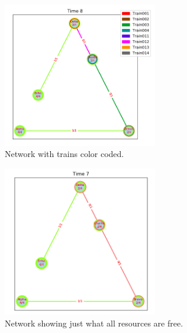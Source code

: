 \begin{figure}[h]
    \centering
    \includegraphics[width=0.6\textwidth]{graph}
    \caption{ Network with trains color coded.  }
    \label{image-myimage5}
\end{figure}

\begin{figure}[h]
    \centering
    \includegraphics[width=0.6\textwidth]{graph2}
    \caption{ Network showing just what all resources are free.  }
    \label{image-myimage6}
\end{figure}